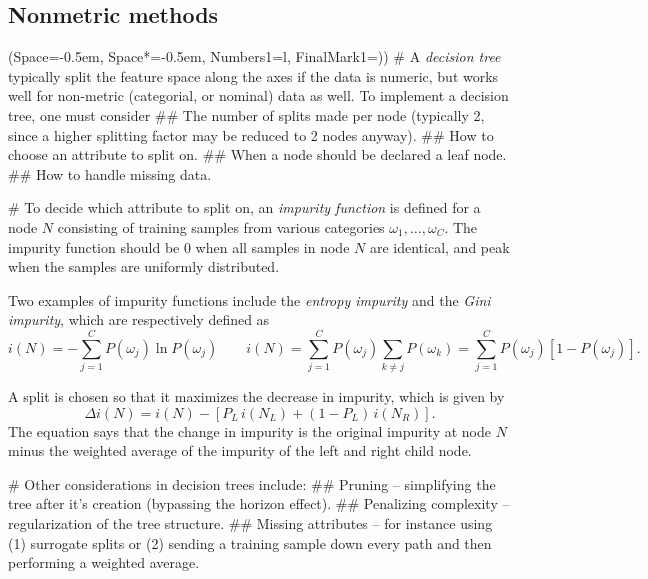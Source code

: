 \documentclass[12pt, a4paper]{article}
\newcommand{\listSpace}{-0.5em}%
\begin{document}
\subsection{Nonmetric methods}
\begin{easylist}[itemize]
	\ListProperties(Space=\listSpace, Space*=\listSpace, Numbers1=l, FinalMark1={)})
	# A \emph{decision tree} typically split the feature space along the axes if the data is numeric, but works well for non-metric (categorial, or nominal) data as well.
	To implement a decision tree, one must consider
	## The number of splits made per node (typically 2, since a higher splitting factor may be reduced to 2 nodes anyway).
	## How to choose an attribute to split on.
	## When a node should be declared a leaf node.
	## How to handle missing data.
	
	# To decide which attribute to split on, an \emph{impurity function} is defined for a node $N$ consisting of training samples from various categories $\omega_1, \dots, \omega_C$.
	The impurity function should be 0 when all samples in node $N$ are identical, and peak when the samples are uniformly distributed.
	
	Two examples of impurity functions include the \emph{entropy impurity} and the \emph{Gini impurity}, which are respectively defined as
	\begin{equation*}
		i(N) = - \sum_{j=1}^{C} P(\omega_j) \ln P(\omega_j) 
		\qquad
		i(N) =  \sum_{j=1}^{C} P(\omega_j) \sum_{k\neq j} P(\omega_k)
		= \sum_{j=1}^{C} P(\omega_j) \left[ 1 - P(\omega_j) \right].
	\end{equation*}
	
	A split is chosen so that it maximizes the decrease in impurity, which is given by
	\begin{equation*}
		\Delta i(N) = i(N) - \left[ P_L \, i(N_L) + (1 - P_L) \, i(N_R)\right].
	\end{equation*}
	The equation says that the change in impurity is the original impurity at node $N$ minus the weighted average of the impurity of the left and right child node.
	
	# Other considerations in decision trees include:
	## Pruning -- simplifying the tree after it's creation (bypassing the horizon effect).
	## Penalizing complexity -- regularization of the tree structure.
	## Missing attributes -- for instance using (1) surrogate splits or (2) sending a training sample down every path and then performing a weighted average.
	

\end{easylist}
\end{document}
